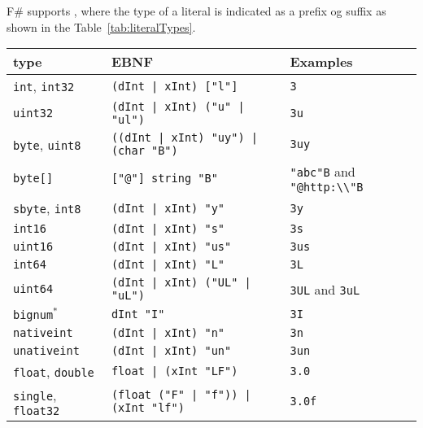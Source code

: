 F\# supports , where the type of a literal is indicated as a prefix og suffix as shown in the Table~\ref{tab:literalTypes}.
\begin{table}
  \centering
  \begin{tabular}{|l|l|l|}
    \hline
    type & EBNF & Examples \\
    \hline
    \lstinline!int!, \lstinline!int32! & \lstinline[language=ebnf]!(dInt | xInt) ["l"]!  & \lstinline!3! \\
    \lstinline!uint32! & \lstinline[language=ebnf]!(dInt | xInt) ("u" | "ul")! & \lstinline!3u! \\
    \lstinline!byte!, \lstinline!uint8! & \lstinline[language=ebnf]!((dInt | xInt) "uy") | (char "B")!  & \lstinline!3uy!  \\
    \lstinline!byte[]! & \lstinline[language=ebnf]!["@"] string "B"!  & \lstinline!"abc"B! and \lstinline!"@http:\\"B!  \\
    \lstinline!sbyte!, \lstinline!int8! & \lstinline[language=ebnf]!(dInt | xInt) "y"! & \lstinline!3y!  \\
    \lstinline!int16! & \lstinline[language=ebnf]!(dInt | xInt) "s"!  & \lstinline!3s!  \\
    \lstinline!uint16! & \lstinline[language=ebnf]!(dInt | xInt) "us"! & \lstinline!3us!  \\
    \lstinline!int64! & \lstinline[language=ebnf]!(dInt | xInt) "L"!  & \lstinline!3L!  \\
    \lstinline!uint64! & \lstinline[language=ebnf]!(dInt | xInt) ("UL" | "uL")!  & \lstinline!3UL! and \lstinline!3uL!  \\
    \lstinline!bignum!$^*$ & \lstinline[language=ebnf]!dInt "I"! & \lstinline!3I!  \\
    \lstinline!nativeint! & \lstinline[language=ebnf]!(dInt | xInt) "n"! & \lstinline!3n!  \\
    \lstinline!unativeint! & \lstinline[language=ebnf]!(dInt | xInt) "un"!  & \lstinline!3un!  \\
    \lstinline!float!, \lstinline!double! & \lstinline[language=ebnf]!float | (xInt "LF")!  & \lstinline!3.0!  \\
    \lstinline!single!, \lstinline!float32! & \lstinline[language=ebnf]!(float ("F" | "f")) | (xInt "lf") !  & \lstinline!3.0f!  \\

\end{tabular}
\end{table}
